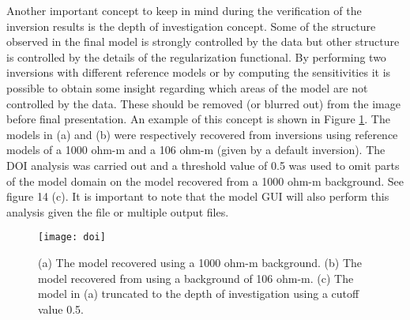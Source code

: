 Another important concept to keep in mind during the verification of the inversion results is the depth of investigation concept. Some of the structure observed in the final model is strongly controlled by the data but other structure is controlled by the details of the regularization functional. By performing two inversions with different reference models or by computing the sensitivities it is possible to obtain some insight regarding which areas of the model are not controlled by the data. These should be removed (or blurred out) from the image before final presentation. An example of this concept is shown in Figure \ref{fig:DOI}. The models in (a) and (b) were respectively recovered from inversions using reference models of a 1000 ohm-m and a 106 ohm-m (given by a default inversion). The DOI analysis was carried out and a threshold value of 0.5 was used to omit parts of the model domain on the model recovered from a 1000 ohm-m background. See figure 14 (c). It is important to note that the model GUI will also perform this analysis given the  file or multiple output  files. 
%
\begin{figure}
\centering
\texttt{[image: doi]}
\caption{(a) The model recovered using a 1000 ohm-m background. (b) The model recovered from using a background of 106 ohm-m. (c) The model in (a) truncated to the depth of investigation using a cutoff value 0.5.}
\label{fig:DOI}
\end{figure}
%